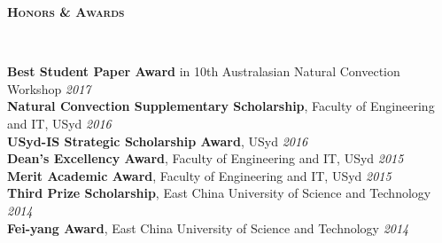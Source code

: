 \documentclass[letterpaper, 10pt]{article}
\newenvironment{changemargin}[2]{%
  \begin{list}{}{%
      \setlength{\topsep}{0pt}%
      \setlength{\leftmargin}{#1}%
      \setlength{\rightmargin}{#2}%
      \setlength{\listparindent}{\parindent}%
      \setlength{\itemindent}{\parindent}%
      \setlength{\parsep}{\parskip}%
    }%
  \item[]}{\end{list}
}
\newcommand{\lineover}{
  \begin{changemargin}{-0.05in}{-0.05in}
    \vspace*{-8pt}
    \hrulefill \\
    \vspace*{-2pt}
  \end{changemargin}
}
\newcommand{\header}[1]{
  \begin{changemargin}{-0.5in}{-0.5in}
    \textbf{\scshape{#1}}\\
    \lineover
  \end{changemargin}
}
\newenvironment{body} {
  \vspace*{-16pt}
  \begin{changemargin}{-0.25in}{-0.5in}
  }
  {\end{changemargin}
}
\begin{document}




\newpage
\header{Honors \& Awards}
\begin{body}
	\vspace{14pt}
	\textbf{Best Student Paper Award}
	in 10th Australasian Natural Convection Workshop
	\hfill \emph{2017}\\ \smallskip
	\textbf{Natural Convection Supplementary Scholarship}, Faculty of Engineering and IT, USyd \hfill
	\emph{2016}\\ \smallskip
	\textbf{USyd-IS Strategic Scholarship Award}, 
	USyd \hfill \emph{2016}\\
	\smallskip
	\textbf{Dean's Excellency Award}, Faculty of Engineering and IT, USyd \hfill \emph{2015}\\
	\textbf{Merit Academic Award}, Faculty of Engineering and IT, USyd \hfill \emph{2015}\\
	\textbf{Third Prize Scholarship}, East China University of Science and Technology \hfill \emph{2014}\\
	\textbf{Fei-yang Award}, East China University of Science and Technology \hfill \emph{2014}\\
	
	
\end{body}
\end{document}
